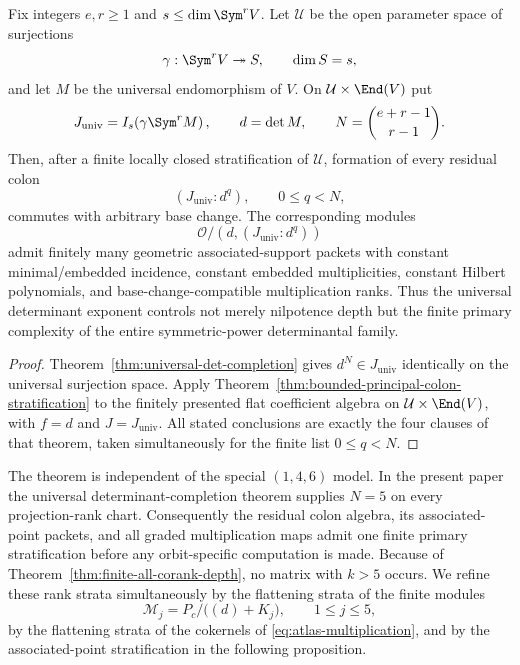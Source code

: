 \begin{corollary}
\label{cor:universal-primary-finiteness}
Fix integers \(e,r\ge1\) and \(s\le\dim\Sym^rV\).  Let \(\mathcal U\)
be the open parameter space of surjections
\[
 \gamma:\Sym^rV\twoheadrightarrow S,\qquad \dim S=s,
\]
and let \(M\) be the universal endomorphism of \(V\).  On
\(\mathcal U\times\End(V)\) put
\[
 J_{\mathrm{univ}}=
 I_s\!\left(\gamma\Sym^rM\right),\qquad d=\det M,
 \qquad N=\binom{e+r-1}{r-1}.
\]
Then, after a finite locally closed stratification of \(\mathcal U\),
formation of every residual colon
\[
 (J_{\mathrm{univ}}:d^q),\qquad 0\le q<N,
\]
commutes with arbitrary base change.  The corresponding modules
\[
 \mathcal O/(d,(J_{\mathrm{univ}}:d^q))
\]
admit finitely many geometric associated-support packets with constant
minimal/embedded incidence, constant embedded multiplicities, constant
Hilbert polynomials, and base-change-compatible multiplication ranks.
Thus the universal determinant exponent controls not merely nilpotence
depth but the finite primary complexity of the entire symmetric-power
determinantal family.
\end{corollary}

\begin{proof}
Theorem~\ref{thm:universal-det-completion} gives
\(d^N\in J_{\mathrm{univ}}\) identically on the universal
surjection space.  Apply
Theorem~\ref{thm:bounded-principal-colon-stratification} to the
finitely presented flat coefficient algebra on
\(\mathcal U\times\End(V)\), with \(f=d\) and
\(J=J_{\mathrm{univ}}\).  All stated conclusions are exactly the
four clauses of that theorem, taken simultaneously for the finite list
\(0\le q<N\).
\end{proof}

The theorem is independent of the special \((1,4,6)\) model.  In the
present paper the universal determinant-completion theorem supplies
\(N=5\) on every projection-rank chart.  Consequently the residual
colon algebra, its associated-point packets, and all graded
multiplication maps admit one finite primary stratification before
any orbit-specific computation is made.
Because of Theorem~\ref{thm:finite-all-corank-depth}, no matrix with
\(k>5\) occurs.  We refine these rank strata simultaneously by the
flattening strata of the finite modules
\[
 \mathcal M_j=P_c/\bigl((d)+K_j\bigr),\qquad 1\le j\le5,
\]
by the flattening strata of the cokernels of
\eqref{eq:atlas-multiplication}, and by the associated-point
stratification in the following proposition.

